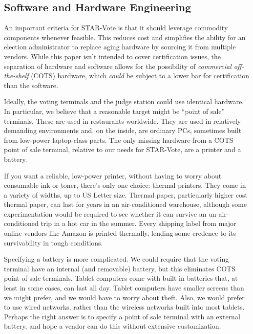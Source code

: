 \documentclass[letterpaper, 10pt, twocolumn]{article}
\newcommand{\projname}{STAR-Vote\xspace}
\begin{document}
\subsection{Software and Hardware Engineering}

An important criteria for \projname is that it should leverage commodity components whenever feasible. This reduces cost and simplifies the ability for an election administrator to replace aging hardware by sourcing it from multiple vendors. While this paper isn't intended to cover certification issues, the separation of hardware and software allows for the possibility of {\em commercial off-the-shelf} (COTS) hardware, which {\em could} be subject to a lower bar for certification than the software.

Ideally, the voting terminals and the judge station could use identical hardware. In particular, we believe that a reasonable target might be ``point of sale'' terminals. These are used in restaurants worldwide. They are used in relatively demanding environments and, on the inside, are ordinary PCs, sometimes built from low-power laptop-class parts. The only missing hardware from a COTS point of sale terminal, relative to our needs for \projname, are a printer and a battery.

If you want a reliable, low-power printer, without having to worry about consumable ink or toner, there's only one choice: thermal printers. They come in a variety of widths, up to US Letter size. Thermal paper, particularly higher cost thermal paper, can last for years in an air-conditioned warehouse, although some experimentation would be required to see whether it can survive an un-air-conditioned trip in a hot car in the summer. Every shipping label from major online vendors like Amazon is printed thermally, lending some credence to its survivability in tough conditions.


Specifying a battery is more complicated. We could require that the voting terminal have an internal (and removable) battery, but this eliminates COTS point of sale terminals. Tablet computers come with built-in batteries that, at least in some cases, can last all day. Tablet computers have smaller screens than we might prefer, and we would have to worry about theft. Also, we would prefer to use wired networks, rather than the wireless networks built into most tablets. Perhaps the right answer is to specify a point of sale terminal with an external battery, and hope a vendor can do this without extensive customization.
\end{document}
